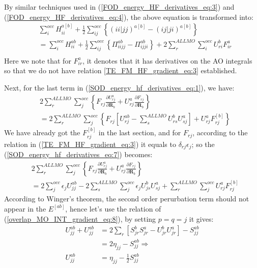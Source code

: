 By similar techniques used in (\ref{FOD_energy_HF_derivatives_eq:3}) and
(\ref{FOD_energy_HF_derivatives_eq:4}), the above equation is transformed into: 
\begin{equation}
 \label{SOD_energy_hf_derivatives_eq:6}
\begin{split}
 &\sum_{i}^{occ}H_{ii}^{a[b]} + \frac{1}{2}
    \sum_{ij}^{occ}
    \left \{ ( ii|jj)^{a[b]} - ( ij|ji)^{a[b]}
    \right \}  \\
&=\sum_{i}^{occ}H_{ii}^{ab} + \frac{1}{2}
    \sum_{ij}^{occ}
    \left \{ \Pi_{iijj}^{ab} - \Pi_{ijji}^{ab}
    \right \} + 2\sum_{r}^{ALL MO}\sum_{i}^{occ}U^{b}_{ri}F^{a}_{ir}  \\
\end{split}
\end{equation}
Here we note that for $F^{a}_{ir}$, it denotes that it has derivatives on the
AO integrals so that we do not have relation \ref{TE_FM_HF_gradient_eq:3}
established.

Next, for the last term in (\ref{SOD_energy_hf_derivatives_eq:1}), we have:
\begin{equation}
 \label{SOD_energy_hf_derivatives_eq:7}
\begin{split}
 & 2\sum_{r}^{ALL
MO}\sum_{j}^{occ}\left\lbrace F_{rj}\frac{\partial U^{a}_{rj}}{\partial
\bm{R}_{b}} + U^{a}_{rj}\frac{\partial F_{rj}}{\partial
\bm{R}_{b}}\right\rbrace \\
&= 2\sum_{r}^{ALL
MO}\sum_{j}^{occ} \left\lbrace F_{rj}\left[U^{ab}_{rj}  -
\sum_{s}^{ALL MO}U^{b}_{rs}U^{a}_{sj} \right] +  U^{a}_{rj} 
F_{rj}^{[b]}\right\rbrace 
\end{split}
\end{equation}
We have already got the $F_{rj}^{[b]}$ in the last section, and for $F_{rj}$,
according to the relation in (\ref{TE_FM_HF_gradient_eq:3}) it equals to
$\delta_{rj}\epsilon_{j}$; so the (\ref{SOD_energy_hf_derivatives_eq:7})
becomes:
\begin{equation}
  \label{SOD_energy_hf_derivatives_eq:8}
\begin{split}
 & 2\sum_{r}^{ALL
MO}\sum_{j}^{occ}\left\lbrace F_{rj}\frac{\partial U^{a}_{rj}}{\partial
\bm{R}_{b}} + U^{a}_{rj}\frac{\partial F_{rj}}{\partial
\bm{R}_{b}}\right\rbrace \\
&= 2\sum_{j}^{occ} \epsilon_{j}U^{ab}_{jj} -  2\sum_{s}^{ALL MO}\sum_{j}^{occ}
\epsilon_{j}U^{b}_{js}U^{a}_{sj} + \sum_{r}^{ALL MO}\sum_{j}^{occ}U^{a}_{rj} 
F_{rj}^{[b]}
\end{split}
\end{equation}
According to Winger's theorem, the second order perurbation term should not
appear in the $E^{[ab]}$, hence let's use the relation of
(\ref{overlap_MO_INT_gradient_eq:8}), by setting $p=q=j$ it gives:
\begin{align}
  U^{ab}_{jj}  + U^{ab}_{jj} &= 
2\sum_{r}\left[ S^{b}_{jr} S^{a}_{jr} 
-U^{b}_{jr}U^{a}_{jr}  \right]  - S^{ab}_{jj} \nonumber \\ 
&= 2\eta_{jj} - S^{ab}_{jj}\Longrightarrow \nonumber \\ 
 U^{ab}_{jj} &= \eta_{jj} - \frac{1}{2}S^{ab}_{jj}
\end{align}

